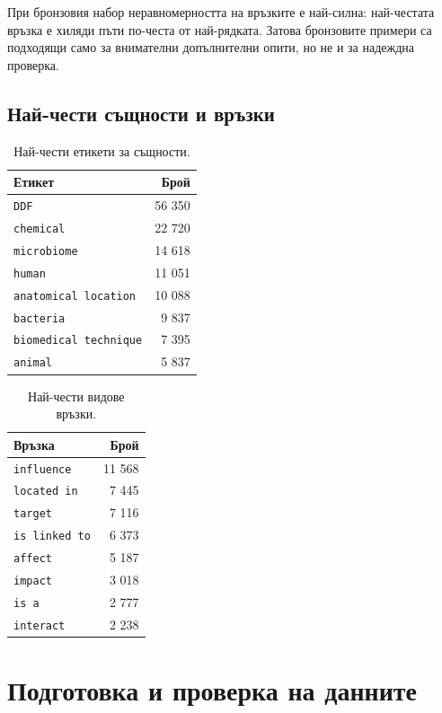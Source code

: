 \documentclass[12pt,a4paper]{article}
\begin{document}
При бронзовия набор неравномерността на връзките е най-силна: най-честата връзка е хиляди пъти по-честа от най-рядката. Затова бронзовите примери са подходящи само за внимателни допълнителни опити, но не и за надеждна проверка.

\subsection{Най-чести същности и връзки}

\begin{minipage}{0.48\linewidth}
\begin{longtable}{lr}
\caption{Най-чести етикети за същности.}\\
\toprule
\textbf{Етикет} & \textbf{Брой} \\
\midrule
\texttt{DDF} & 56 350 \\
\texttt{chemical} & 22 720 \\
\texttt{microbiome} & 14 618 \\
\texttt{human} & 11 051 \\
\texttt{anatomical location} & 10 088 \\
\texttt{bacteria} & 9 837 \\
\texttt{biomedical technique} & 7 395 \\
\texttt{animal} & 5 837 \\
\bottomrule
\end{longtable}
\end{minipage}
\hfill
\begin{minipage}{0.48\linewidth}
\begin{longtable}{lr}
\caption{Най-чести видове връзки.}\\
\toprule
\textbf{Връзка} & \textbf{Брой} \\
\midrule
\texttt{influence} & 11 568 \\
\texttt{located in} & 7 445 \\
\texttt{target} & 7 116 \\
\texttt{is linked to} & 6 373 \\
\texttt{affect} & 5 187 \\
\texttt{impact} & 3 018 \\
\texttt{is a} & 2 777 \\
\texttt{interact} & 2 238 \\
\bottomrule
\end{longtable}
\end{minipage}

\section{Подготовка и проверка на данните}
\end{document}
